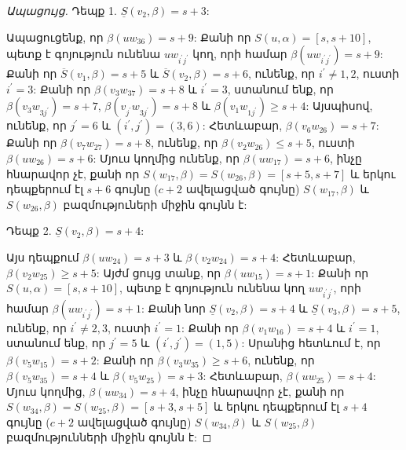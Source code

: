 \begin{proof}[Ապացույց]
Դեպք 1. $\underline{S}(v_{2},\beta)= s+3$:

Ապացուցենք, որ $\beta(uw_{36})= s+9$: Քանի որ
$S(u,\alpha)=[s,s+10]$, պետք է գոյություն ունենա 
$uw_{i^{\prime}j^{\prime}}$ կող, որի համար
$\beta\left(uw_{i^{\prime}j^{\prime}}\right)=s+9$: Քանի որ $\overline{S}(v_{1},\beta)= s+5$ և $\overline{S}(v_{2},\beta)= s+6$, ունենք, որ
$i^{\prime}\neq 1,2$, ուստի $i^{\prime}=3$: Քանի որ
$\beta(v_{3}w_{37})= s+8$ և $i^{\prime}=3$, ստանում ենք, որ
$\beta(v_{3}w_{3j^{\prime}})= s+7$,
$\beta(v_{j^{\prime}}w_{3j^{\prime}})= s+8$ և
$\beta(v_{1}w_{1j^{\prime}})\geq s+4$: Այսպիսով, ունենք, որ $j^{\prime}=6$
և $\left(i^{\prime},j^{\prime}\right)=(3,6)$: Հետևաբար, 
$\beta(v_{6}w_{26})= s+7$: Քանի որ $\beta(v_{7}w_{27})= s+8$, ունենք, որ
$\beta(v_{2}w_{26})\leq s+5$, ուստի $\beta(uw_{26})= s+6$: Մյուս կողմից ունենք, որ $\beta(uw_{17})= s+6$, ինչը հնարավոր չէ,
քանի որ $S(w_{17},\beta)=S(w_{26},\beta)=[s+5,s+7]$ և երկու դեպքերում էլ $s+6$ գույնը ($c+2$ ավելացված գույնը) 
$S(w_{17},\beta)$ և $S(w_{26},\beta)$ բազմություների միջին գույնն է:

Դեպք 2. $\underline{S}(v_{2},\beta)= s+4$:

Այս դեպքում $\beta(uw_{24})=s+3$ և $\beta(v_{2}w_{24})= s+4$:
Հետևաբար, $\beta(v_{2}w_{25})\geq s+5$: Այժմ ցույց տանք, որ
$\beta(uw_{15})= s+1$: Քանի որ $S(u,\alpha)=[s,s+10]$, պետք է գոյություն ունենա կող $uw_{i^{\prime}j^{\prime}}$, որի համար
$\beta\left(uw_{i^{\prime}j^{\prime}}\right)=s+1$: Քանի նոր $\underline{S}(v_{2},\beta)= s+4$ և $\underline{S}(v_{3},\beta)= s+5$, ունենք, որ
$i^{\prime}\neq 2,3$, ուստի $i^{\prime}=1$: Քանի որ
$\beta(v_{1}w_{16})=s+4$ և $i^{\prime}=1$, ստանում ենք, որ
$j^{\prime}=5$ և $\left(i^{\prime},j^{\prime}\right)=(1,5)$: Սրանից հետևում է, որ $\beta(v_{5}w_{15})= s+2$: Քանի որ
$\beta(v_{3}w_{35})\geq s+6$, ունենք, որ $\beta(v_{5}w_{35})= s+4$ և
$\beta(v_{5}w_{25})= s+3$: Հետևաբար, $\beta(uw_{25})= s+4$:
Մյուս կողմից, $\beta(uw_{34})= s+4$, ինչը հնարավոր չէ, քանի որ $S(w_{34},\beta)=S(w_{25},\beta)=[s+3,s+5]$ և
երկու դեպքերում էլ $s+4$ գույնը ($c+2$ ավելացված գույնը) $S(w_{34},\beta)$ և $S(w_{25},\beta)$ բազմությունների միջին գույնն է:
\end{proof}
